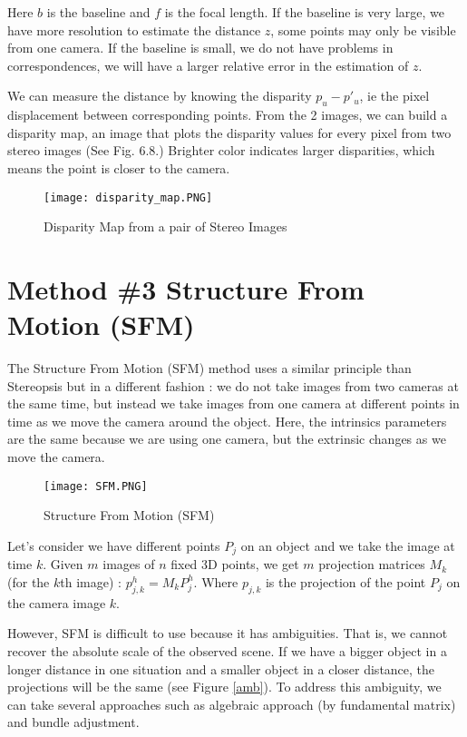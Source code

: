 \documentclass[twoside]{article}
\begin{document}
Here $b$ is the baseline and $f$ is the focal length. If the baseline is very large, we have more resolution to estimate the distance $z$, some points may only be visible from one camera. If the baseline is small, we do not have problems in correspondences, we will have a larger relative error in the estimation of $z$.

We can measure the distance by knowing the disparity $p_u-p'_u$, ie the pixel displacement between corresponding points. From the 2 images, we can build a disparity map, an image that plots the disparity values for every pixel from two stereo images (See Fig. 6.8.) Brighter color indicates larger disparities, which means the point is closer to the camera.

\begin{figure}[h!]
  \begin{center}
	\texttt{[image: disparity\_map.PNG]}  \end{center}
  \caption{Disparity Map from a pair of Stereo Images}
  \label{ex}
\end{figure}

\newpage
\section{Method \#3 Structure From Motion (SFM)}

The Structure From Motion (SFM) method uses a similar principle than Stereopsis but in a different fashion : we do not take images from two cameras at the same time, but instead we take images from one camera at different points in time as we move the camera around the object. Here, the intrinsics parameters are the same because we are using one camera, but the extrinsic changes as we move the camera.

\begin{figure}[h!]
  \begin{center}
	\texttt{[image: SFM.PNG]}  \end{center}
  \caption{Structure From Motion (SFM)}
  \label{ex}
\end{figure}

Let's consider we have different points $P_j$ on an object and we take the image at time $k$. Given $m$ images of $n$ fixed 3D points, we get $m$ projection matrices $M_k$ (for the $k$th image) : $p_{j,k}^h = M_k P_j^h$.
Where $p_{j,k}$ is the projection of the point $P_j$ on the camera image $k$.

However, SFM is difficult to use because it has ambiguities. That is, we cannot recover the absolute scale of the observed scene. If we have a bigger object in a longer distance in one situation and a smaller object in a closer distance, the projections will be the same (see Figure \ref{amb}). To address this ambiguity, we can take several approaches such as algebraic approach (by fundamental matrix) and bundle adjustment.
\end{document}
